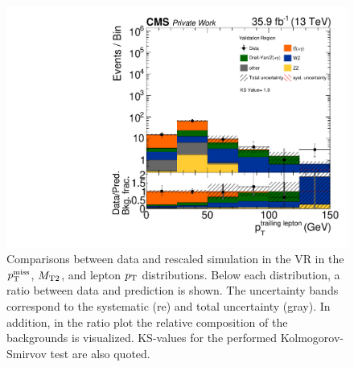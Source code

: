 \begin{figure}[tbp]
 \includegraphics[width=\pairwidth]{figures/plots_VR/VR_LL_pt2_log}
 \caption{Comparisons between data and rescaled simulation in the VR in the $p_{\mathrm{T}}^\text{miss}$, $M_{\mathrm{T2}}$, and lepton $p_{\mathrm{T}}$ distributions. Below each distribution, a ratio between data and prediction is shown. The uncertainty bands correspond to the systematic (re) and total uncertainty (gray). In addition, in the ratio plot the relative composition of the backgrounds is visualized. KS-values for the performed Kolmogorov-Smirvov test are also quoted.}
 \label{fig:VR1}
\end{figure}


